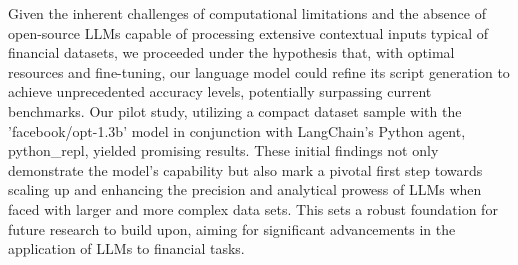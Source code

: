 \documentclass[logo,msc]{infthesis}           %
\begin{document}
Given the inherent challenges of computational limitations and the absence of open-source LLMs capable of processing extensive contextual inputs typical of financial datasets, we proceeded under the hypothesis that, with optimal resources and fine-tuning, our language model could refine its script generation to achieve unprecedented accuracy levels, potentially surpassing current benchmarks. Our pilot study, utilizing a compact dataset sample with the 'facebook/opt-1.3b' model in conjunction with LangChain's Python agent, python\_repl, yielded promising results. These initial findings not only demonstrate the model's capability but also mark a pivotal first step towards scaling up and enhancing the precision and analytical prowess of LLMs when faced with larger and more complex data sets. This sets a robust foundation for future research to build upon, aiming for significant advancements in the application of LLMs to financial tasks.
\end{document}
